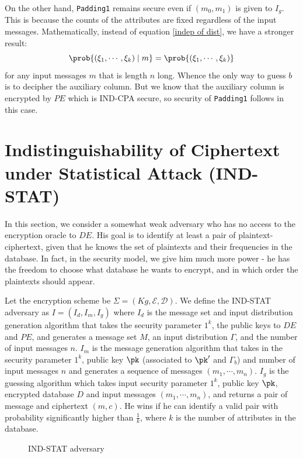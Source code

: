 On the other hand, \texttt{Padding1} remains secure even if $(m_0, m_1)$ is given to $I_g$. This is because the counts of the attributes are fixed regardless of the input messages. Mathematically, instead of equation \ref{indep of dist}, we have a stronger result:
\begin{equation*}
	\prob{(\xi_1, \cdots, \xi_k) \mid m} = \prob{(\xi_1, \cdots, \xi_k)}
\end{equation*}
for any input messages $m$ that is length $n$ long. Whence the only way to guess $b$ is to decipher the auxiliary column. But we know that the auxiliary column is encrypted by $PE$ which is IND-CPA secure, so security of \texttt{Padding1} follows in this case.




\section{Indistinguishability of Ciphertext under Statistical Attack (IND-STAT)}
In this section, we consider a somewhat weak adversary who has no access to the encryption oracle to $DE$. His goal is to identify at least a pair of plaintext-ciphertext, given that he knows the set of plaintexts and their frequencies in the database. In fact, in the security model, we give him much more power - he has the freedom to choose what database he wants to encrypt, and in which order the plaintexts should appear.


Let the encryption scheme be $\Sigma = (Kg, \mathcal{E}, \mathcal{D})$. We define the IND-STAT adversary as $I = (I_d, I_m, I_g)$ where $I_d$ is the message set and input distribution generation algorithm that takes the security parameter $1^k$, the public keys to $DE$ and $PE$, and generates a message set $M$, an input distribution $\Gamma$, and the number of input messages $n$. $I_m$ is the message generation algorithm that takes in the security parameter $1^k$, public key $\pk$ (associated to $\pk'$ and $\Gamma_b$) and number of input messages $n$ and generates a sequence of messages $(m_1, \cdots, m_n)$. $I_g$ is the guessing algorithm which takes input security parameter $1^k$, public key $\pk$, encrypted database $D$ and input messages $(m_1, \cdots, m_n)$, and returns a pair of message and ciphertext $(m, c)$. He wins if he can identify a valid pair with probability significantly higher than $\frac{1}{k}$, where $k$ is the number of attributes in the database.
\begin{figure}[H]
	\begin{center}
	\end{center}
	\caption{IND-STAT adversary}
\end{figure}

